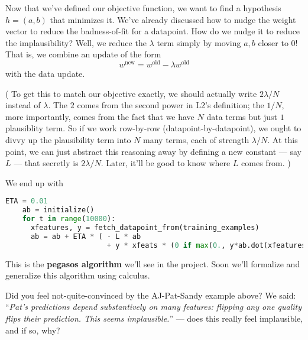   \vfill
{}
  Now that we've defined our objective function,
  we want to find a hypothesis $h=(a,b)$ that minimizes it.
  We've already discussed how to nudge the weight vector to reduce the badness-of-fit for a datapoint.
  How do we nudge it to reduce the implausibility?
  Well, we reduce the $\lambda$ term simply by moving $a,b$ closer to $0$!
  That is, we combine an update of the form
  $$
    w^{\text{new}}
    =w^{\text{old}} - \lambda w^{\text{old}}
  $$
  with the data update.

  (
    To get this to match our objective exactly, we should actually write $2\lambda/N$ instead
    of $\lambda$.  The $2$ comes from the second power in L2's definition; the $1/N$,
    more importantly, comes from the fact that we have $N$ data terms but just
    $1$ plausiblity term.  So if we work row-by-row (datapoint-by-datapoint),
    we ought to divvy up the plausibility term into $N$ many terms, each of strength $\lambda/N$.
    At this point, we can just abstract this reasoning away by defining a new
    constant --- say $L$ --- that secretly is $2\lambda/N$.
    Later, it'll be good to know where $L$ comes from.
    )

  We end up with
  \begin{lstlisting}[language=Python, basicstyle=\footnotesize\ttfamily]
    ETA = 0.01
    ab = initialize()
    for t in range(10000):
      xfeatures, y = fetch_datapoint_from(training_examples)
      ab = ab + ETA * ( - L * ab
                        + y * xfeats * (0 if max(0., y*ab.dot(xfeatures))==0 else 1) )
  \end{lstlisting}
  This is the \textbf{pegasos algorithm} we'll see in the project.
  Soon we'll formalize and generalize this algorithm using calculus.
  \begin{marginfigure}[-8cm]
    \centering
    \caption{%
      With $\lambda=0.02$ the objective visibly prefers weights near $0$.
      We develop an algorithm to take steps in this plane
      toward the minimum, `rolling down' the hill so to speak.
    }
  \end{marginfigure}






\newpage
  \vfill
{}\marginnote{\veryoptional}
  Did you feel not-quite-convinced by the AJ-Pat-Sandy example above?
  We said: ``\emph{Pat's predictions depend substantively on many
  features: flipping any one quality flips their prediction.  This seems
  implausible.}'' --- does this really feel implausible, and if so, why?
